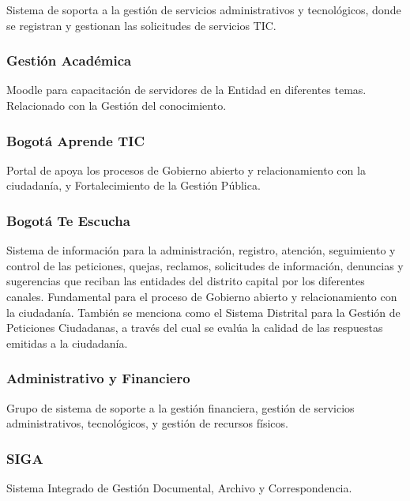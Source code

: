 \documentclass[
	a4paper, %
	12pt, %
]{include/CSSullivanBusinessReport}
\begin{document}
Sistema de soporta a la gestión de servicios administrativos y
tecnológicos, donde se registran y gestionan las solicitudes de
servicios TIC.

\subsubsection{Gestión Académica}\label{sec:gestiuxf3n-acaduxe9mica}

Moodle para capacitación de servidores de la Entidad en diferentes
temas. Relacionado con la Gestión del conocimiento.

\subsubsection{Bogotá Aprende TIC}\label{sec:bogotuxe1-aprende-tic}

Portal de apoya los procesos de Gobierno abierto y relacionamiento con
la ciudadanía, y Fortalecimiento de la Gestión Pública.

\subsubsection{Bogotá Te Escucha}\label{sec:bogotuxe1-te-escucha}

Sistema de información para la administración, registro, atención,
seguimiento y control de las peticiones, quejas, reclamos, solicitudes
de información, denuncias y sugerencias que reciban las entidades del
distrito capital por los diferentes canales. Fundamental para el proceso
de Gobierno abierto y relacionamiento con la ciudadanía. También se
menciona como el Sistema Distrital para la Gestión de Peticiones
Ciudadanas, a través del cual se evalúa la calidad de las respuestas
emitidas a la ciudadanía.

\subsubsection{Administrativo y
Financiero}\label{sec:administrativo-y-financiero}

Grupo de sistema de soporte a la gestión financiera, gestión de
servicios administrativos, tecnológicos, y gestión de recursos físicos.

\subsubsection{SIGA}\label{sec:siga}

Sistema Integrado de Gestión Documental, Archivo y Correspondencia.
\end{document}
